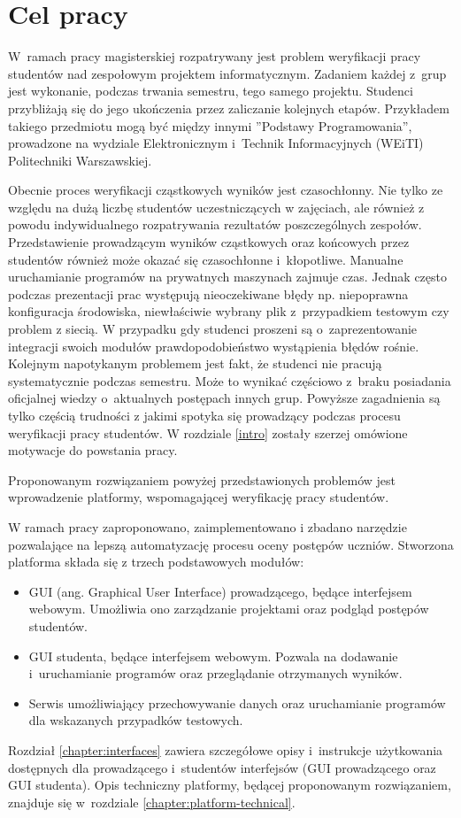\chapter{Cel pracy}

W~ramach pracy magisterskiej rozpatrywany jest problem weryfikacji pracy studentów nad zespołowym projektem informatycznym.
Zadaniem każdej z~grup jest wykonanie, podczas trwania semestru, tego samego projektu.
Studenci przybliżają się do jego ukończenia przez zaliczanie kolejnych etapów.
Przykładem takiego przedmiotu mogą być między innymi ”Podstawy Programowania”, prowadzone na wydziale Elektronicznym i~Technik Informacyjnych (WEiTI) Politechniki Warszawskiej.

Obecnie proces weryfikacji cząstkowych wyników jest czasochłonny.
Nie tylko ze względu na dużą liczbę studentów uczestniczących w zajęciach, ale również z powodu indywidualnego rozpatrywania rezultatów poszczególnych zespołów.
Przedstawienie prowadzącym wyników cząstkowych oraz końcowych przez studentów również może okazać się czasochłonne i~kłopotliwe.
Manualne uruchamianie programów na prywatnych maszynach zajmuje czas.
Jednak często podczas prezentacji prac występują nieoczekiwane błędy np. niepoprawna konfiguracja środowiska, niewłaściwie wybrany plik z~przypadkiem testowym czy problem z siecią.
W przypadku gdy studenci proszeni są o~zaprezentowanie integracji swoich modułów prawdopodobieństwo wystąpienia błędów rośnie.
Kolejnym napotykanym problemem jest fakt, że studenci nie pracują systematycznie podczas semestru.
Może to wynikać częściowo z~braku posiadania oficjalnej wiedzy o~aktualnych postępach innych grup.
Powyższe zagadnienia są tylko częścią trudności z jakimi spotyka się prowadzący podczas procesu weryfikacji pracy studentów.
W rozdziale \ref{intro} zostały szerzej omówione motywacje do powstania pracy.

Proponowanym rozwiązaniem powyżej przedstawionych problemów jest wprowadzenie platformy, wspomagającej weryfikację pracy studentów.

W ramach pracy zaproponowano, zaimplementowano i zbadano narzędzie pozwalające na lepszą automatyzację procesu oceny postępów uczniów.
Stworzona platforma składa się z trzech podstawowych modułów:
\begin{itemize}
    \item GUI (ang. Graphical User Interface) prowadzącego, będące interfejsem webowym. Umożliwia ono zarządzanie projektami oraz podgląd postępów studentów.
    \item GUI studenta, będące interfejsem webowym. Pozwala na dodawanie i~uruchamianie programów oraz przeglądanie otrzymanych wyników.
    \item Serwis umożliwiający przechowywanie danych oraz uruchamianie programów dla wskazanych przypadków testowych.
\end{itemize}
Rozdział \ref{chapter:interfaces} zawiera szczegółowe opisy i~instrukcje użytkowania dostępnych dla prowadzącego i~studentów interfejsów (GUI prowadzącego oraz GUI studenta).
Opis techniczny platformy, będącej proponowanym rozwiązaniem, znajduje się w~rozdziale \ref{chapter:platform-technical}.

